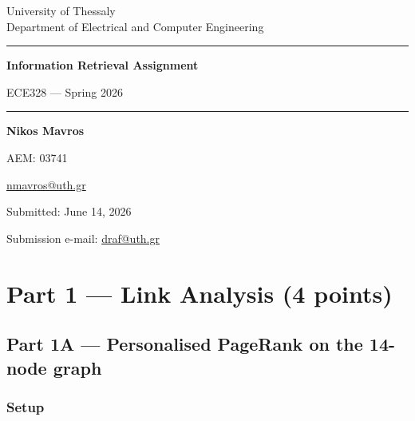 \documentclass[12pt, a4paper]{article}
\begin{document}
\begin{titlepage}
  \centering
  \vspace*{2cm}
  {\Large University of Thessaly \\ Department of Electrical and Computer Engineering \par}
  \vspace{1.5cm}
  {\rule{\linewidth}{0.5pt}\par}
  \vspace{0.5cm}
  {\LARGE\bfseries Information Retrieval Assignment\par}
  \vspace{0.4cm}
  {\large ECE328 — Spring 2026\par}
  \vspace{0.3cm}
  {\rule{\linewidth}{0.5pt}\par}
  \vspace{1.5cm}
  {\large\textbf{Nikos Mavros}\par}
  \vspace{0.2cm}
  {\large AEM: 03741\par}
  \vspace{0.2cm}
  {\large \href{mailto:nmavros@uth.gr}{nmavros@uth.gr}\par}
  \vfill
  {\large Submitted: June 14, 2026\par}
  \vspace{0.5cm}
  {\normalsize Submission e-mail: \href{mailto:draf@uth.gr}{draf@uth.gr}\par}
\end{titlepage}

\tableofcontents
\newpage

\section{Part 1 — Link Analysis (4 points)}

\subsection{Part 1A — Personalised PageRank on the 14-node graph}

\subsubsection*{Setup}
\end{document}
